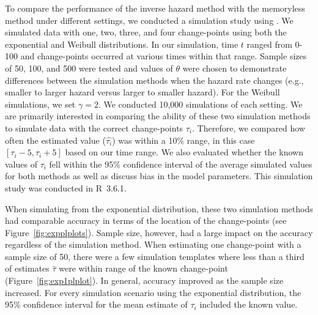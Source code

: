To compare the performance of the inverse hazard method with the memoryless method under different settings, we conducted a simulation study using . We simulated data with one, two, three, and four change-points using both the exponential and Weibull distributions. In our simulation, time $t$ ranged from 0-100 and change-points occurred at various times within that range. Sample sizes of 50, 100, and 500 were tested and values of $\theta$ were chosen to demonstrate differences between the simulation methods when the hazard rate changes (e.g., smaller to larger hazard versus larger to smaller hazard). For the Weibull simulations, we set $\gamma=2$. We conducted 10,000 simulations of each setting. We are primarily interested in comparing the ability of these two simulation methods to simulate data with the correct change-points $\tau_i$. Therefore, we compared how often the estimated value ($\hat{\tau_i}$) was within a 10\% range, in this case $[\tau_i-5, \tau_i+5]$ based on our time range. We also evaluated whether the known values of $\tau_i$ fell within the 95\% confidence interval of the average simulated values for both methods as well as discuss bias in the model parameters. This simulation study was conducted in R~3.6.1. 

When simulating from the exponential distribution, these two simulation methods had comparable accuracy in terms of the location of the change-points (see Figure~\ref{fig:expplplots}). Sample size, however, had a large impact on the accuracy regardless of the simulation method. When estimating one change-point with a sample size of 50, there were a few simulation templates where less than a third of estimates $\hat{\tau}$ were within range of the known change-point (Figure~\ref{fig:exp1plplot}). In general, accuracy improved as the sample size increased. For every simulation scenario using the exponential distribution, the 95\% confidence interval for the mean estimate of $\tau_i$ included the known value.

